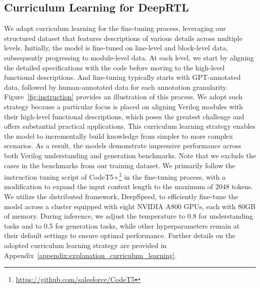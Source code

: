 \subsection{Curriculum Learning for DeepRTL}
We adapt curriculum learning for the fine-tuning process, leveraging our structured dataset that features descriptions of various details across multiple levels.
Initially, the model is fine-tuned on line-level and block-level data, subsequently progressing to module-level data. At each level, we start by aligning the detailed specifications with the code before moving to the high-level functional descriptions. 
And fine-tuning typically starts with GPT-annotated data, followed by human-annotated data for each annotation granularity.
Figure~\ref{fig:instruction} provides an illustration of this process.
We adopt such strategy because a particular focus is placed on aligning Verilog modules with their high-level functional descriptions, which poses the greatest challenge and offers substantial practical applications.
This curriculum learning strategy enables the model to incrementally build knowledge from simpler to more complex scenarios. As a result, the models demonstrate impressive performance across both Verilog understanding and generation benchmarks.
Note that we exclude the cases in the benchmarks from our training dataset.
We primarily follow the instruction tuning script of CodeT5+\footnote{\url{https://github.com/salesforce/CodeT5}} in the fine-tuning process, with a modification to expand the input context length to the maximum of $2048$ tokens.  We utilize the distributed framework, DeepSpeed, to efficiently fine-tune the model across a cluster equipped with eight NVIDIA A800 GPUs, each with 80GB of memory. During inference, we adjust the temperature to 0.8 for understanding tasks and to 0.5 for generation tasks, while other hyperparameters remain at their default settings to ensure optimal performance. 
Further details on the adopted curriculum learning strategy are provided in Appendix~\ref{appendix:explanation_curriculum_learning}.



